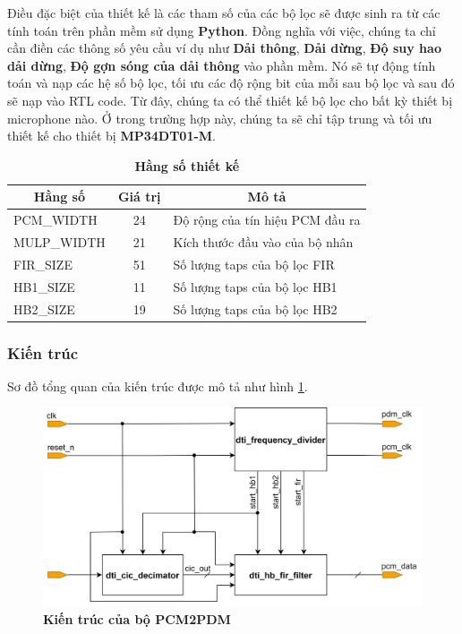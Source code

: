 Điều đặc biệt của thiết kế là các tham số của các bộ lọc sẽ được sinh ra từ các tính toán trên phần mềm sử dụng \textbf{Python}. Đồng nghĩa với việc, chúng ta chỉ cần điền các thông số yêu cầu ví dụ như \textbf{Dải thông}, \textbf{Dải dừng}, \textbf{Độ suy hao dải dừng}, \textbf{Độ gợn sóng của dải thông} vào phần mềm. Nó sẽ tự động tính toán và nạp các hệ số bộ lọc, tối ưu các độ rộng bit của mỗi sau bộ lọc và sau đó sẽ nạp vào RTL code. Từ đây, chúng ta có thể thiết kế bộ lọc cho bất kỳ thiết bị microphone nào. Ở trong trường hợp này, chúng ta sẽ chỉ tập trung và tối ưu thiết kế cho thiết bị \textbf{MP34DT01-M}.


\begin{table}[H]
    \centering
    \caption[Hằng số thiết kế]{\bfseries\fontsize{12pt}{0pt}\selectfont Hằng số thiết kế}
\begin{tabular}{|l|c|l|}
\hline
\multicolumn{1}{|c|}{\textbf{Hằng số}} & \textbf{Giá trị} & \multicolumn{1}{c|}{\textbf{Mô tả}} \\ \hline
PCM\_WIDTH  & 24 & Độ rộng của tín hiệu PCM đầu ra \\ \hline
MULP\_WIDTH & 21 & Kích thước đầu vào của bộ nhân  \\ \hline
FIR\_SIZE   & 51 & Số lượng taps của bộ lọc FIR    \\ \hline
HB1\_SIZE   & 11 & Số lượng taps của bộ lọc HB1    \\ \hline
HB2\_SIZE   & 19 & Số lượng taps của bộ lọc HB2    \\ \hline
\end{tabular}
    \label{hangso}
\end{table}
\subsubsection{Kiến trúc}
Sơ đồ tổng quan của kiến trúc được mô tả như hình \ref{arc_top}.
\begin{figure}[H]
    \centering
    \includegraphics[width=12cm]{Images/Chuong4/arc_top.png}
    \caption[Kiến trúc của bộ PCM2PDM]{\bfseries \fontsize{12pt}{0pt}\selectfont Kiến trúc của bộ PCM2PDM}
    \label{arc_top}
\end{figure}

